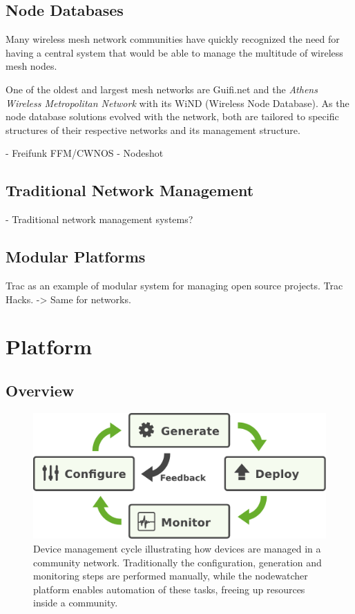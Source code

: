 \documentclass[5p,sort&compress]{elsarticle}
\begin{document}
\subsection{Node Databases}

Many wireless mesh network communities have quickly recognized the need for having a central system that would be able to manage the multitude of wireless mesh nodes.

One of the oldest and largest mesh networks are Guifi.net \cite{Guifi_2003,Vega_2012} and the \textit{Athens Wireless Metropolitan Network} with its WiND \cite{AWMN_WIND_2002} (Wireless Node Database). As the node database solutions evolved with the network, both are tailored to specific structures of their respective networks and its management structure.

- Freifunk FFM/CWNOS \cite{Funkfeuer_2012}
- Nodeshot \cite{Nodeshot_2012}

\subsection{Traditional Network Management}

- Traditional network management systems?

\subsection{Modular Platforms}

Trac as an example of modular system for managing open source projects. Trac Hacks. -> Same for networks.

\section{Platform}
\label{sec:platform}

\subsection{Overview}

\begin{figure}
  \centering
  \includegraphics[scale=0.4]{figures/device-mgmt-cycle.pdf}
  \caption{Device management cycle illustrating how devices are managed in a community network. Traditionally the configuration, generation and monitoring steps are performed manually, while the nodewatcher platform enables automation of these tasks, freeing up resources inside a community.}
  \label{fig:device-mgmt-cycle}
\end{figure}
\end{document}
